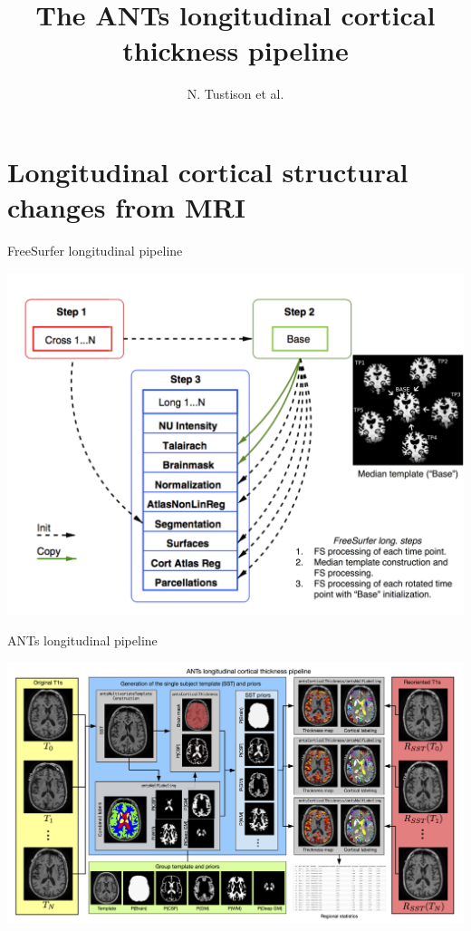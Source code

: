 \documentclass[ignorenonframetext,]{beamer}
\institute{UVa/UCI}
\title{The ANTs longitudinal cortical thickness pipeline}
\author{N. Tustison et al.}
\date{}
\begin{document}
\frame{\titlepage}

\section{Longitudinal cortical structural changes from
MRI}\label{longitudinal-cortical-structural-changes-from-mri}

\begin{frame}{FreeSurfer longitudinal pipeline}

\centering
\includegraphics[width=0.85 \textwidth]{../Figures/FreeSurferLong.png}

\end{frame}

\begin{frame}{ANTs longitudinal pipeline}

\centering
\includegraphics[width=0.99 \textwidth]{../Figures/longitudinalPipeline.png}

\end{frame}
\end{document}
